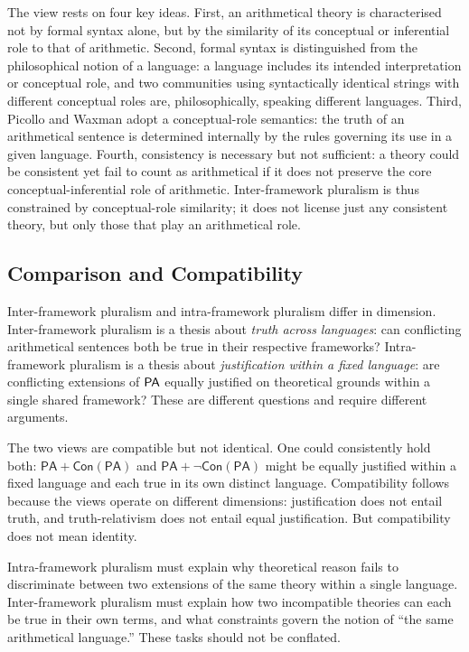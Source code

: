 \documentclass[a4paper,12pt]{amsart}
\theoremstyle{definition}
\numberwithin{equation}{section}
\begin{document}
The view rests on four key ideas. First, an arithmetical theory is 
characterised not by formal syntax alone, but by the similarity of its 
conceptual or inferential role to that of arithmetic. Second, formal 
syntax is distinguished from the philosophical notion of a language: a 
language includes its intended interpretation or conceptual role, and 
two communities using syntactically identical strings with different 
conceptual roles are, philosophically, speaking different languages. Third, Picollo and Waxman adopt a conceptual-role semantics: the truth 
of an arithmetical sentence is determined internally by the rules 
governing its use in a given language. Fourth, consistency is necessary 
but not sufficient: a theory could be consistent yet fail to count as 
arithmetical if it does not preserve the core conceptual-inferential 
role of arithmetic. Inter-framework pluralism is thus constrained by 
conceptual-role similarity; it does not license just any consistent 
theory, but only those that play an arithmetical role.
 
\subsection{Comparison and Compatibility}
Inter-framework pluralism and intra-framework pluralism differ in 
dimension. Inter-framework pluralism is a thesis about \emph{truth across languages}: can conflicting arithmetical sentences both be true in their 
respective frameworks? Intra-framework pluralism is a thesis about 
\emph{justification within a fixed language}: are conflicting extensions of 
${\sf PA}$ equally justified on theoretical grounds within a single 
shared framework? These are different questions and require different 
arguments.
  
The two views are compatible but not identical. One could consistently 
hold both: $\mathsf{PA}+\mathsf{Con}(\mathsf{PA})$ and 
$\mathsf{PA}+\neg\mathsf{Con}(\mathsf{PA})$ might be equally justified 
within a fixed language and each true in its own distinct language. 
Compatibility follows because the views operate on different 
dimensions: justification does not entail truth, and truth-relativism 
does not entail equal justification. But compatibility does not mean 
identity. 

Intra-framework pluralism must explain why theoretical reason 
fails to discriminate between two extensions of the same theory within 
a single language. Inter-framework pluralism must explain how two 
incompatible theories can each be true in their own terms, and what 
constraints govern the notion of ``the same arithmetical language.'' 
These tasks should not be conflated.
 
\end{document}

